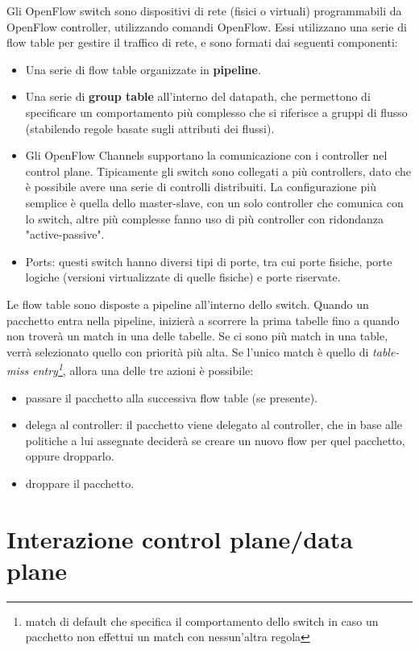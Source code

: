 Gli OpenFlow switch sono dispositivi di rete (fisici o virtuali) programmabili da OpenFlow controller, utilizzando comandi OpenFlow. Essi utilizzano una serie di flow table per gestire il traffico di rete, e sono formati dai seguenti componenti:

\begin{itemize}
\item Una serie di flow table organizzate in \textbf{pipeline}.
\item Una serie di \textbf{group table} all'interno del datapath, che permettono di specificare un comportamento più complesso che si riferisce a gruppi di flusso (stabilendo regole basate sugli attributi dei flussi).
\item Gli OpenFlow Channels supportano la comunicazione con i controller nel control plane. Tipicamente gli switch sono collegati a più controllers, dato che è possibile avere una serie di controlli distribuiti. La configurazione più semplice è quella dello master-slave, con un solo controller che comunica con lo switch, altre più complesse fanno uso di più controller con ridondanza "active-passive".
\item Ports: questi switch hanno diversi tipi di porte, tra cui porte fisiche, porte logiche (versioni virtualizzate di quelle fisiche)  e porte riservate.
\end{itemize}

Le flow table sono disposte a pipeline all'interno dello switch. Quando un pacchetto entra nella pipeline, inizierà a scorrere la prima tabelle fino a quando non troverà un match in una delle tabelle. Se ci sono più match in una table, verrà selezionato quello con priorità più alta. Se l'unico match è quello di \textit{table-miss entry\footnote{match di default che specifica il comportamento dello switch in caso un pacchetto non effettui un match con nessun'altra regola}}, allora una delle tre azioni è possibile:

\begin{itemize}
    \item passare il pacchetto alla successiva flow table (se presente).
    \item delega al controller: il pacchetto viene delegato al controller, che in base alle politiche a lui assegnate deciderà se creare un nuovo flow per quel pacchetto, oppure dropparlo.
    \item droppare il pacchetto.
\end{itemize}

\section{Interazione control plane/data plane}

